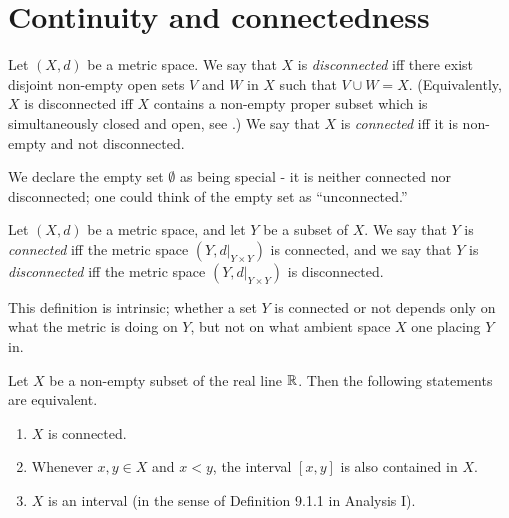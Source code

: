 \section{Continuity and connectedness}\label{ii:sec:2.4}

\begin{defn}\label{ii:2.4.1}
  Let \((X, d)\) be a metric space.
  We say that \(X\) is \emph{disconnected} iff there exist disjoint non-empty open sets \(V\) and \(W\) in \(X\) such that \(V \cup W = X\).
  (Equivalently, \(X\) is disconnected iff \(X\) contains a non-empty proper subset which is simultaneously closed and open, see .)
  We say that \(X\) is \emph{connected} iff it is non-empty and not disconnected.
\end{defn}

\begin{note}
  We declare the empty set \(\emptyset\) as being special
  - it is neither connected nor disconnected;
  one could think of the empty set as ``unconnected.''
\end{note}

\setcounter{thm}{2}
\begin{defn}\label{ii:2.4.3}
  Let \((X, d)\) be a metric space, and let \(Y\) be a subset of \(X\).
  We say that \(Y\) is \emph{connected} iff the metric space \((Y, d|_{Y \times Y})\) is connected, and we say that \(Y\) is \emph{disconnected} iff the metric space \((Y, d|_{Y \times Y})\) is disconnected.
\end{defn}

\begin{rmk}\label{ii:2.4.4}
  This definition is intrinsic;
  whether a set \(Y\) is connected or not depends only on what the metric is doing on \(Y\), but not on what ambient space \(X\) one placing \(Y\) in.
\end{rmk}

\begin{thm}\label{ii:2.4.5}
  Let \(X\) be a non-empty subset of the real line \(\mathbb{R}\).
  Then the following statements are equivalent.
  \begin{enumerate}
    \item\label{ii:2.4.5.a} \(X\) is connected.
    \item\label{ii:2.4.5.b} Whenever \(x, y \in X\) and \(x < y\), the interval \([x, y]\) is also contained in \(X\).
    \item\label{ii:2.4.5.c} \(X\) is an interval (in the sense of Definition 9.1.1 in Analysis I).
  \end{enumerate}
\end{thm}

